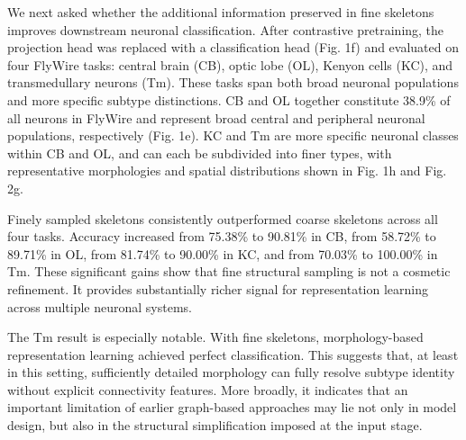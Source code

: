 \documentclass{article}
\begin{document}
We next asked whether the additional information preserved in fine skeletons improves downstream neuronal classification. After contrastive pretraining, the projection head was replaced with a classification head (Fig. 1f) and evaluated on four FlyWire tasks: central brain (CB), optic lobe (OL), Kenyon cells (KC), and transmedullary neurons (Tm). These tasks span both broad neuronal populations and more specific subtype distinctions. CB and OL together constitute 38.9\% of all neurons in FlyWire and represent broad central and peripheral neuronal populations, respectively (Fig. 1e). KC and Tm are more specific neuronal classes within CB and OL, and can each be subdivided into finer types, with representative morphologies and spatial distributions shown in Fig. 1h and Fig. 2g.



Finely sampled skeletons consistently outperformed coarse skeletons across all four tasks. Accuracy increased from 75.38\% to 90.81\% in CB, from 58.72\% to 89.71\% in OL, from 81.74\% to 90.00\% in KC, and from 70.03\% to 100.00\% in Tm. These significant gains show that fine structural sampling is not a cosmetic refinement. It provides substantially richer signal for representation learning across multiple neuronal systems.

The Tm result is especially notable. With fine skeletons, morphology-based representation learning achieved perfect classification. This suggests that, at least in this setting, sufficiently detailed morphology can fully resolve subtype identity without explicit connectivity features. More broadly, it indicates that an important limitation of earlier graph-based approaches may lie not only in model design, but also in the structural simplification imposed at the input stage.
\end{document}
